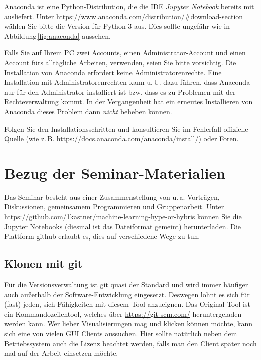 \documentclass{tufte-handout}
\begin{document}
Anaconda ist eine Python-Distribution, die die IDE \emph{Jupyter Notebook} bereits mit ausliefert.
Unter \url{https://www.anaconda.com/distribution/#download-section} wählen Sie bitte die Version für Python 3 aus.
Dies sollte ungefähr wie in Abbildung\,\ref{fig:anaconda} aussehen.

Falls Sie auf Ihrem PC zwei Accounts, einen Administrator-Account und einen Account fürs alltägliche Arbeiten, verwenden, seien Sie bitte vorsichtig.
Die Installation von Anaconda erfordert keine Administratorenrechte.
Eine Installation mit Administratorenrechten kann u.\,U. dazu führen, dass Anaconda nur für den Administrator installiert ist bzw. dass es zu Problemen mit der Rechteverwaltung kommt.
In der Vergangenheit hat ein erneutes Installieren von Anaconda dieses Problem dann \emph{nicht} beheben können.

Folgen Sie den Installationsschritten und konsultieren Sie im Fehlerfall offizielle Quelle (wie z.\,B. \url{https://docs.anaconda.com/anaconda/install/}) oder Foren.


\section{Bezug der Seminar-Materialien}

Das Seminar besteht aus einer Zusammenstellung von u.\,a. Vorträgen, Diskussionen, gemeinsamem Programmieren und Gruppenarbeit.
Unter \url{https://github.com/1kastner/machine-learning-hype-or-hybris} können Sie die Jupyter Notebooks (diesmal ist das Dateiformat gemeint) herunterladen.
Die Plattform github erlaubt es, dies auf verschiedene Wege zu tun.

\subsection{Klonen mit git}

Für die Versionsverwaltung ist git quasi der Standard und wird immer häufiger auch außerhalb der Software-Entwicklung eingesetzt.
Deswegen lohnt es sich für (fast) jeden, sich Fähigkeiten mit diesem Tool anzueignen.
Das Original-Tool ist ein Kommandozeilentool, welches über \url{https://git-scm.com/} heruntergeladen werden kann.
Wer lieber Visualisierungen mag und klicken können möchte, kann sich eine von vielen GUI Clients%
aussuchen.
Hier sollte natürlich neben dem Betriebssystem auch die Lizenz beachtet werden, falls man den Client später noch mal auf der Arbeit einsetzen möchte.
\end{document}

